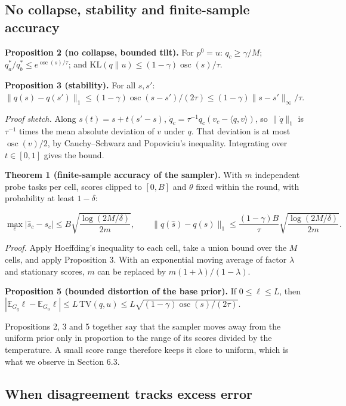 \documentclass[mathematics,article,submit,pdftex,moreauthors]{Definitions/mdpi}
\begin{document}
\subsection{No collapse, stability and finite-sample accuracy}

\textbf{Proposition 2 (no collapse, bounded tilt).} For $p^{0}=u$: $q_c\ge\gamma/M$; $q^{*}_a/q^{*}_b\le e^{\operatorname{osc}(s)/\tau}$; and $\mathrm{KL}(q\|u)\le(1-\gamma)\operatorname{osc}(s)/\tau$.

\textbf{Proposition 3 (stability).} For all $s,s'$: $\|q(s)-q(s')\|_1\le(1-\gamma)\operatorname{osc}(s-s')/(2\tau)\le(1-\gamma)\|s-s'\|_\infty/\tau$.

\emph{Proof sketch.} Along $s(t)=s+t(s'-s)$, $\dot q_c=\tau^{-1}q_c(v_c-\langle q,v\rangle)$, so $\|\dot q\|_1$ is $\tau^{-1}$ times the mean absolute deviation of $v$ under $q$. That deviation is at most $\operatorname{osc}(v)/2$, by Cauchy--Schwarz and Popoviciu's inequality. Integrating over $t\in[0,1]$ gives the bound.

\textbf{Theorem 1 (finite-sample accuracy of the sampler).} With $m$ independent probe tasks per cell, scores clipped to $[0,B]$ and $\theta$ fixed within the round, with probability at least $1-\delta$:

\begin{equation}
\max_c|\hat s_c-s_c|\le B\sqrt{\frac{\log(2M/\delta)}{2m}},\qquad
\|q(\hat s)-q(s)\|_1\le\frac{(1-\gamma)B}{\tau}\sqrt{\frac{\log(2M/\delta)}{2m}}.
\end{equation}

\emph{Proof.} Apply Hoeffding's inequality \cite{hoeffding1963probability} to each cell, take a union bound over the $M$ cells, and apply Proposition 3. With an exponential moving average of factor $\lambda$ and stationary scores, $m$ can be replaced by $m(1+\lambda)/(1-\lambda)$.

\textbf{Proposition 5 (bounded distortion of the base prior).} If $0\le\ell\le L$, then $|\mathbb{E}_{G_q}\ell-\mathbb{E}_{G_u}\ell|\le L\,\mathrm{TV}(q,u)\le L\sqrt{(1-\gamma)\operatorname{osc}(s)/(2\tau)}$.

Propositions 2, 3 and 5 together say that the sampler moves away from the uniform prior only in proportion to the range of its scores divided by the temperature. A small score range therefore keeps it close to uniform, which is what we observe in Section 6.3.

\subsection{When disagreement tracks excess error}
\end{document}
